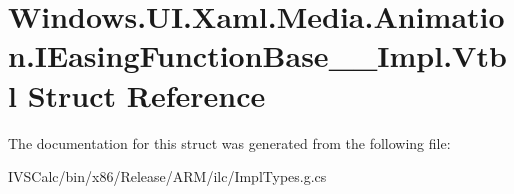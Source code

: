 \hypertarget{struct_windows_1_1_u_i_1_1_xaml_1_1_media_1_1_animation_1_1_i_easing_function_base_____impl_1_1_vtbl}{}\section{Windows.\+U\+I.\+Xaml.\+Media.\+Animation.\+I\+Easing\+Function\+Base\+\_\+\+\_\+\+Impl.\+Vtbl Struct Reference}
\label{struct_windows_1_1_u_i_1_1_xaml_1_1_media_1_1_animation_1_1_i_easing_function_base_____impl_1_1_vtbl}


The documentation for this struct was generated from the following file\+:\begin{DoxyCompactItemize}
\item 
I\+V\+S\+Calc/bin/x86/\+Release/\+A\+R\+M/ilc/Impl\+Types.\+g.\+cs\end{DoxyCompactItemize}
